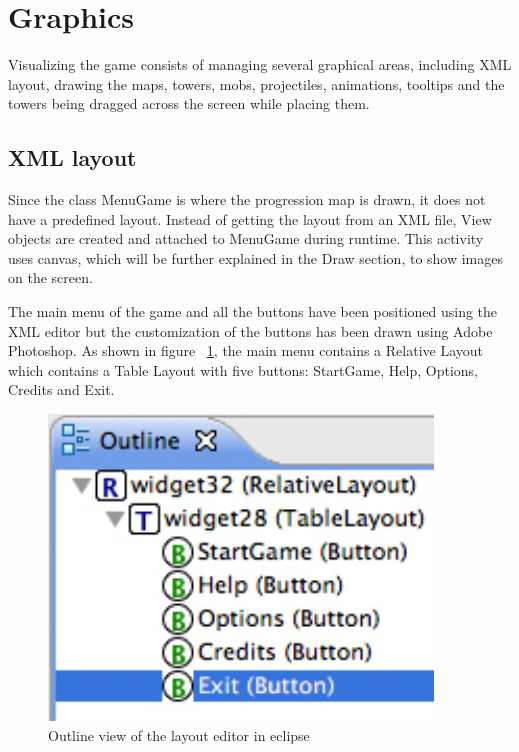 \section{Graphics}

Visualizing the game consists of managing several graphical areas, including XML layout, drawing the maps, towers, mobs, projectiles, animations, tooltips and the towers being dragged across the screen while placing them.

\subsection{XML layout}

Since the class MenuGame is where the progression map is drawn, it does not have a predefined layout. Instead of getting the layout from an XML file, View objects are created and attached to MenuGame during runtime. This activity uses canvas, which will be further explained in the Draw section, to show images on the screen. 

The main menu of the game and all the buttons have been positioned using the XML editor but the customization of the buttons has been drawn using Adobe Photoshop. As shown in figure ~\ref{fig:xmlLayout}, the main menu contains a Relative Layout which contains a Table Layout with five buttons: StartGame, Help, Options, Credits and Exit. 

\begin{figure}[h]
\begin{center}
\includegraphics[scale=0.7]{pics/chapters/chapter4/xmllayout}
\end{center}
\caption{Outline view of the layout editor in eclipse}
\label{fig:xmlLayout}
\end{figure}

